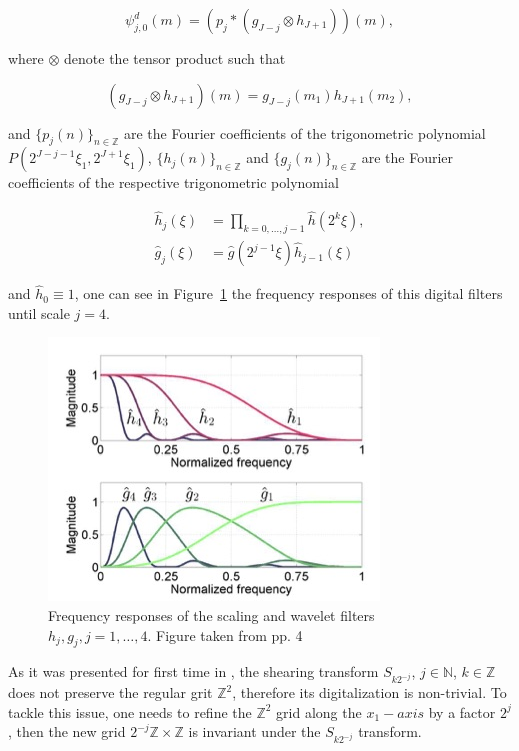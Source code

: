 \begin{equation}
\label{eq:LFshearlets5}
\psi^d_{j,0}(m)=(p_j\ast(g_{J-j}\otimes h_{J+1}))(m),
\end{equation}

where $\otimes$ denote the tensor product such that 

$$
(g_{J-j}\otimes h_{J+1})(m)=g_{J-j}(m_1)h_{J+1}(m_2),
$$

and $\{p_j(n)\}_{n\in\mathbb{Z}}$ are the Fourier coefficients of the trigonometric polynomial $P(2^{J-j-1}\xi_1,2^{J+1}\xi_1)$, $\{ h_j(n)\}_{n\in\mathbb{Z}}$ and $\{g_j(n)\}_{n\in\mathbb{Z}}$ are the Fourier coefficients of the respective trigonometric polynomial

$$
\begin{aligned}
\hat{h}_j(\xi)&=\prod_{k=0,\ldots,j-1}\hat{h}(2^k\xi),\\
\hat{g}_j(\xi)&=\hat{g}(2^{j-1}\xi)\hat{h}_{j-1}(\xi)
\end{aligned}
$$

and $\hat{h}_0\equiv 1$, one can see in Figure~\ref{fig:magnitude_response} the frequency responses of this digital filters until scale $j=4$. 

\begin{figure}[h!]
\centering
\includegraphics[width = 0.7 \textwidth]{./Diagrams/magnitude_response.jpg}
\caption{Frequency responses of the scaling and wavelet filters $h_j,g_j,j=1,\ldots,4$. Figure taken from \cite{LF-Shearlets} pp. 4}
\label{fig:magnitude_response}
\end{figure}

As it was presented for first time in \cite{Nonseparableshear}, the shearing transform $S_{k2^{-j}}$, $j\in\mathbb{N}$, $k\in\mathbb{Z}$ does not preserve the regular grit $\mathbb{Z}^2$, therefore its digitalization is non-trivial. To tackle this issue, one needs to refine the $\mathbb{Z}^2$ grid along the $x_1-axis$ by a factor $2^j$, then the new grid $2^{-j}\mathbb{Z}\times\mathbb{Z}$ is invariant under the $S_{k 2^{-j}}$ transform. 

